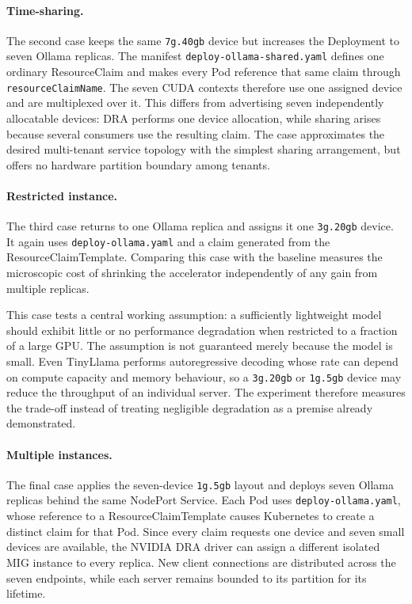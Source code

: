 \paragraph{Time-sharing.}
The second case keeps the same \texttt{7g.40gb} device but increases the Deployment to seven Ollama replicas. The manifest \texttt{deploy-ollama-shared.yaml} defines one ordinary ResourceClaim and makes every Pod reference that same claim through \texttt{resourceClaimName}. The seven CUDA contexts therefore use one assigned device and are multiplexed over it. This differs from advertising seven independently allocatable devices: DRA performs one device allocation, while sharing arises because several consumers use the resulting claim. The case approximates the desired multi-tenant service topology with the simplest sharing arrangement, but offers no hardware partition boundary among tenants.

\paragraph{Restricted instance.}
The third case returns to one Ollama replica and assigns it one \texttt{3g.20gb} device. It again uses \texttt{deploy-ollama.yaml} and a claim generated from the ResourceClaimTemplate. Comparing this case with the baseline measures the microscopic cost of shrinking the accelerator independently of any gain from multiple replicas.

This case tests a central working assumption: a sufficiently lightweight model should exhibit little or no performance degradation when restricted to a fraction of a large GPU. The assumption is not guaranteed merely because the model is small. Even TinyLlama performs autoregressive decoding whose rate can depend on compute capacity and memory behaviour, so a \texttt{3g.20gb} or \texttt{1g.5gb} device may reduce the throughput of an individual server. The experiment therefore measures the trade-off instead of treating negligible degradation as a premise already demonstrated.

\paragraph{Multiple instances.}
The final case applies the seven-device \texttt{1g.5gb} layout and deploys seven Ollama replicas behind the same NodePort Service. Each Pod uses \texttt{deploy-ollama.yaml}, whose reference to a ResourceClaimTemplate causes Kubernetes to create a distinct claim for that Pod. Since every claim requests one device and seven small devices are available, the NVIDIA DRA driver can assign a different isolated MIG instance to every replica. New client connections are distributed across the seven endpoints, while each server remains bounded to its partition for its lifetime.

